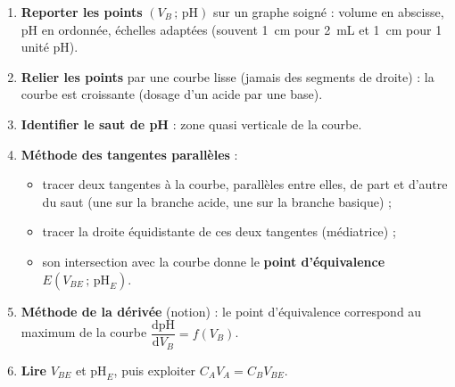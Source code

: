 \documentclass[11pt]{article}
\begin{document}
\begin{methode}
\begin{enumerate}
\item \textbf{Reporter les points} $(V_B\,;\,\mathrm{pH})$ sur un graphe soigné : volume en abscisse, pH en ordonnée, échelles adaptées (souvent \SI{1}{cm} pour \SI{2}{mL} et \SI{1}{cm} pour 1 unité pH).
\item \textbf{Relier les points} par une courbe lisse (jamais des segments de droite) : la courbe est croissante (dosage d'un acide par une base).
\item \textbf{Identifier le saut de pH} : zone quasi verticale de la courbe.
\item \textbf{Méthode des tangentes parallèles} :
\begin{itemize}
\item tracer deux tangentes à la courbe, parallèles entre elles, de part et d'autre du saut (une sur la branche acide, une sur la branche basique) ;
\item tracer la droite équidistante de ces deux tangentes (médiatrice) ;
\item son intersection avec la courbe donne le \textbf{point d'équivalence} $E(V_{BE}\,;\,\mathrm{pH}_E)$.
\end{itemize}
\item \textbf{Méthode de la dérivée} (notion) : le point d'équivalence correspond au maximum de la courbe $\dfrac{\mathrm{d}\mathrm{pH}}{\mathrm{d}V_B} = f(V_B)$.
\item \textbf{Lire} $V_{BE}$ et $\mathrm{pH}_E$, puis exploiter $C_A V_A = C_B V_{BE}$.
\end{enumerate}
\end{methode}
\end{document}

